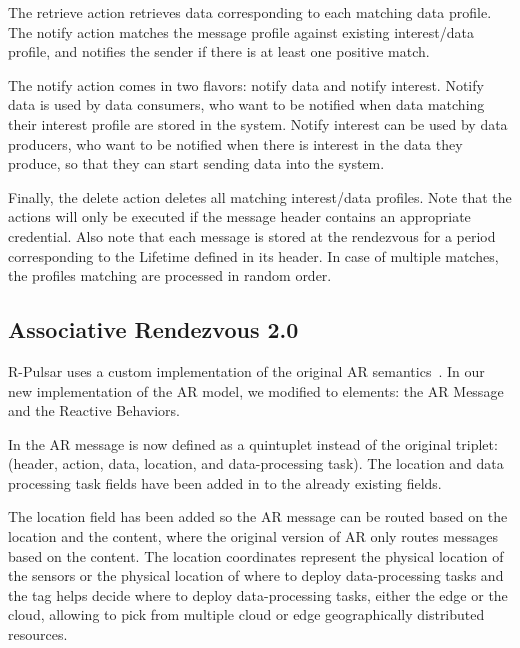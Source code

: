 The retrieve action retrieves data corresponding to each matching data profile. The notify action
matches the message profile against existing interest/data profile, and notifies the sender if there
is at least one positive match. 

The notify action comes in two flavors: notify data and notify interest.
Notify data is used by data consumers, who want to be notified when data matching their interest
profile are stored in the system. Notify interest can be used by data producers, who want to be notified
when there is interest in the data they produce, so that they can start sending data into the system.

Finally, the delete action deletes all matching interest/data profiles. Note that the actions will
only be executed if the message header contains an appropriate credential. Also note that each
message is stored at the rendezvous for a period corresponding to the Lifetime defined in its header.
In case of multiple matches, the profiles matching are processed in random order.

\subsection{Associative Rendezvous 2.0}\label{sec:semantics}
R-Pulsar uses a custom implementation of the original AR semantics~\cite{meteor2008}. In our new implementation of the AR model, we modified to elements: the AR Message and the Reactive Behaviors.

In the AR message is now defined as a quintuplet instead of the original triplet: (header, action, data, location, and data-processing task). The location and data processing task fields have been added in to the already existing fields.

The location field has been added so the AR message can be routed based on the location and the content, where the original version of AR only routes messages based on the content. The location coordinates represent the physical location of the sensors or the physical location of where to deploy data-processing tasks and the tag helps decide where to deploy data-processing tasks, either the edge or the cloud, allowing to pick from multiple cloud or edge geographically distributed resources.


